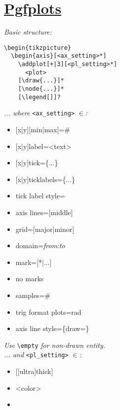 \section{\href{http://mirrors.ctan.org/graphics/pgf/contrib/pgfplots/doc/pgfplots.pdf}{Pgfplots}}
\textit{Basic structure:}\\
\begin{minipage}{6.5cm}
\begin{lstlisting}
\begin{tikzpicture}
  \begin{axis}[<ax_setting>*]
    \addplot[+|3][<pl_setting>*]
      <plot>
    [\draw{...}]*
    [\node{...}]*
    [\legend[]]?
\end{lstlisting}
\end{minipage}
\textit{... where }\texttt{<ax\_setting>}\textit{ $\in$:}\\ 
\begin{multicols}{2}
{\scriptsize 
\begin{itemize}[label={}]
    \item {[x|y]}[min|max]=\#
    \item {[x|y]}label=<text>
    \item {[x|y]}tick=\{...\}
    \item {[x|y]}ticklabels=\{...\}
    \item tick label style=
    \item axis lines=[middle]
    \item grid=[major|minor]
    \item domain=\textit{from}:\textit{to}
    \item mark=[*|...]
    \item no marks
    \item samples=\#
    \item {\scriptsize trig format plots=rad}
    \item {\scriptsize axis line style=\{draw=\}}
\end{itemize}
}
\end{multicols}
\textit{Use } \texttt{\textbackslash empty} \textit{ for non-drawn entity.}\\
\textit{... and }\texttt{<pl\_setting>}\textit{ $\in$:}\\ 
\begin{multicols}{2}
\begin{itemize}[label={}]
    \item {[[ultra]thick]}
    \item <color>
    \item 
\end{itemize}
\end{multicols}\ \\

